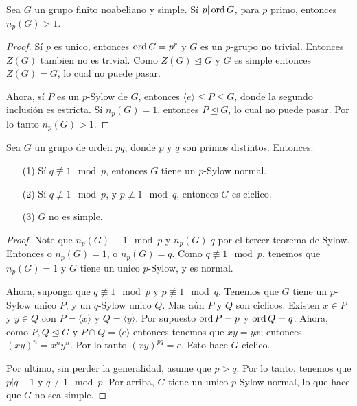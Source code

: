 \begin{lemma}\label{9.40}
    Sea $G$ un grupo finito noabeliano y simple. S\'i  $p|\operatorname{ord}{G}$, para $p$
    primo, entonces  $n_p(G)>1$.
\end{lemma}
\begin{proof}
    S\'i $p$ es unico, entonces $\operatorname{ord}{G}=p^r$ y $G$ es un  $p$-grupo no trivial.
    Entonces  $Z(G)$ tambien no es trivial. Como $Z(G) \unlhd G$ y $G$ es
    simple entonces $Z(G)=G$, lo cual no puede pasar.

    Ahora, s\'i $P$ es un  $p$-Sylow de $G$, entonces  $\langle e \rangle \leq P
    \leq G$, donde la segundo inclusi\'on es estricta. S\'i $n_p(G)=1$, entonces
     $P \unlhd G$, lo cual no puede pasar. Por lo tanto  $n_p(G)>1$.
\end{proof}

\begin{lemma}\label{9.31}
    Sea $G$ un grupo de orden $pq$, donde $p$ y  $q$ son primos distintos.
    Entonces:
    \begin{enumerate}
        \item[(1)] S\'i $q \not\equiv 1 \mod{p}$, entonces $G$ tiene un
            $p$-Sylow normal.

        \item[(2)] S\'i $q \not\equiv 1 \mod{p}$, y $p \not\equiv 1 \mod{q}$,
            entonces $G$ es ciclico.

        \item[(3)] $G$ no es simple.
    \end{enumerate}
\end{lemma}
\begin{proof}
    Note que $n_p(G) \equiv 1 \mod{p}$ y $n_p(G)|q$ por el tercer teorema de
    Sylow. Entonces o $n_p(G)=1$, o $n_p(G)=q$. Como $q \not\equiv 1 \mod{p}$,
    tenemos que $n_p(G)=1$ y $G$ tiene un unico  $p$-Sylow, y es normal.

    Ahora, suponga que $q \not\equiv 1 \mod{p}$ y $p \not\equiv 1 \mod{q}$.
    Tenemos que $G$ tiene un  $p$-Sylow unico $P$, y un  $q$-Sylow unico $Q$.
    Mas a\'un $P$ y  $Q$ son ciclicos. Existen  $x \in P$ y  $y \in Q$ con
    $P=\langle x \rangle$ y $Q=\langle y \rangle$. Por supuesto $\operatorname{ord}{P}=p$ y
    $\operatorname{ord}{Q}=q$. Ahora, como $P,Q \unlhd G$ y $P \cap Q=\langle e \rangle$
    entonces tenemos que $xy=yx$; entonces  $(xy)^n=x^ny^n$. Por lo tanto
    $(xy)^{pq}=e$. Esto hace $G$ ciclico.

    Por ultimo, sin perder la generalidad, asume que  $p>q$. Por lo tanto,
    tenemos que  $p \not|q-1$ y  $q \not\equiv 1 \mod{p}$. Por arriba, $G$ tiene
    un unico  $p$-Sylow normal, lo que hace que $G$ no sea simple.
\end{proof}

